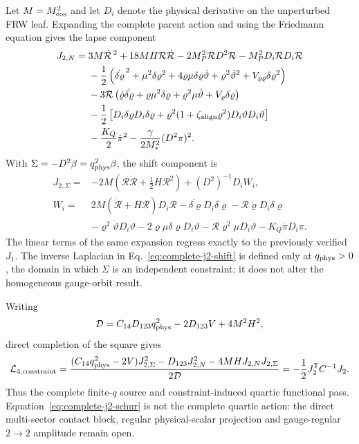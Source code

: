 Let $M=M_{\rm cos}^2$ and let $D_i$ denote the physical derivative on the
unperturbed FRW leaf.  Expanding the complete parent action and using the
Friedmann equation gives the lapse component
\begin{align}
 J_{2,N}={}&3M\dot{\mathcal R}^{\,2}
 +18MH\mathcal R\dot{\mathcal R}
 -2M_P^2\mathcal R D^2\mathcal R
 -M_P^2D_i\mathcal R D_i\mathcal R \nonumber\\
 &-\frac12\left(\dot{\delta\varrho}^{\,2}
 +\mu^2\delta\varrho^2+4\varrho\mu\delta\varrho\dot\vartheta
 +\varrho^2\dot\vartheta^2+V_{\varrho\varrho}\delta\varrho^2\right)
 \nonumber\\
 &-3\mathcal R\left(\dot\varrho\dot{\delta\varrho}
 +\varrho\mu^2\delta\varrho+\varrho^2\mu\dot\vartheta
 +V_\varrho\delta\varrho\right)\nonumber\\
 &-\frac12\left[D_i\delta\varrho D_i\delta\varrho
 +\varrho^2(1+\zeta_{\rm align}\varrho^2)
 D_i\vartheta D_i\vartheta\right]\nonumber\\
 &-\frac{K_Q}{2}\dot\pi^2
 -\frac{\gamma}{2M_*^2}(D^2\pi)^2 .
 \label{eq:complete-j2-lapse}
\end{align}
With $\Sigma=-D^2\beta=q_{\rm phys}^2\beta$, the shift component is
\begin{align}
 J_{2,\Sigma}={}&-2M\left(\mathcal R\dot{\mathcal R}
 +\frac12H\mathcal R^2\right)+(D^2)^{-1}D_iW_i,
 \label{eq:complete-j2-shift}\\
 W_i={}&2M(\dot{\mathcal R}+H\mathcal R)D_i\mathcal R
 -\dot{\delta\varrho}D_i\delta\varrho
 -\mathcal R\dot\varrho D_i\delta\varrho\nonumber\\
 &-\varrho^2\dot\vartheta D_i\vartheta
 -2\varrho\mu\delta\varrho D_i\vartheta
 -\mathcal R\varrho^2\mu D_i\vartheta
 -K_Q\dot\pi D_i\pi .
\end{align}
The linear terms of the same expansion regress exactly to the previously
verified $J_1$.  The inverse Laplacian in
Eq.~\eqref{eq:complete-j2-shift} is defined only at
$q_{\rm phys}>0$, the domain in which $\Sigma$ is an independent constraint;
it does not alter the homogeneous gauge-orbit result.

Writing
\begin{equation}
 \mathcal D=C_{14}D_{123}q_{\rm phys}^2-2D_{123}V+4M^2H^2,
\end{equation}
direct completion of the square gives
\begin{equation}
 \mathcal L_{4,\rm constraint}
 =\frac{(C_{14}q_{\rm phys}^2-2V)J_{2,\Sigma}^2
 -D_{123}J_{2,N}^2-4MHJ_{2,N}J_{2,\Sigma}}{2\mathcal D}
 =-\frac12J_2^{\mathsf T}C^{-1}J_2 .
 \label{eq:complete-j2-schur}
\end{equation}
Thus the complete finite-$q$ source and constraint-induced quartic functional
pass.  Equation~\eqref{eq:complete-j2-schur} is not the complete quartic
action: the direct multi-sector contact block, regular physical-scalar
projection and gauge-regular $2\!\to\!2$ amplitude remain open.


